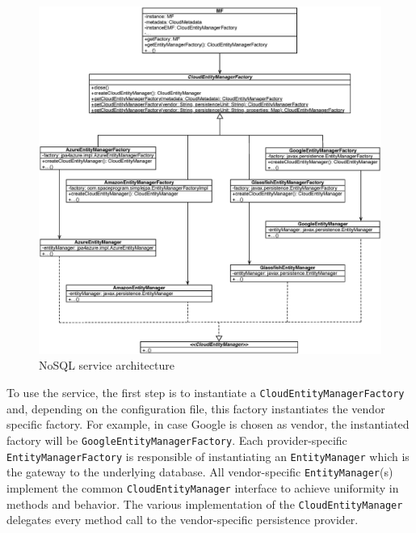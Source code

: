 \begin{figure}[tbh]
  \centering
  \includegraphics[width=14cm]{images/cpim_nosql_old}
  \caption{NoSQL service architecture}
  \label{fig:cpim-nosql}
\end{figure}

\noindent To use the service, the first step is to instantiate a \texttt{CloudEntityManagerFactory} and, depending on the configuration file, this factory instantiates the vendor specific factory. For example, in case Google is chosen as vendor, the instantiated factory will be \texttt{GoogleEntityManagerFactory}. 
Each provider-specific \texttt{EntityManagerFactory} is responsible of instantiating an \texttt{EntityManager} which is the gateway to the underlying database. All vendor-specific \texttt{EntityManager}(s) implement the common \texttt{CloudEntityManager} interface to achieve uniformity in methods and behavior.
The various implementation of the \texttt{CloudEntityManager} delegates every method call to the vendor-specific persistence provider. 

